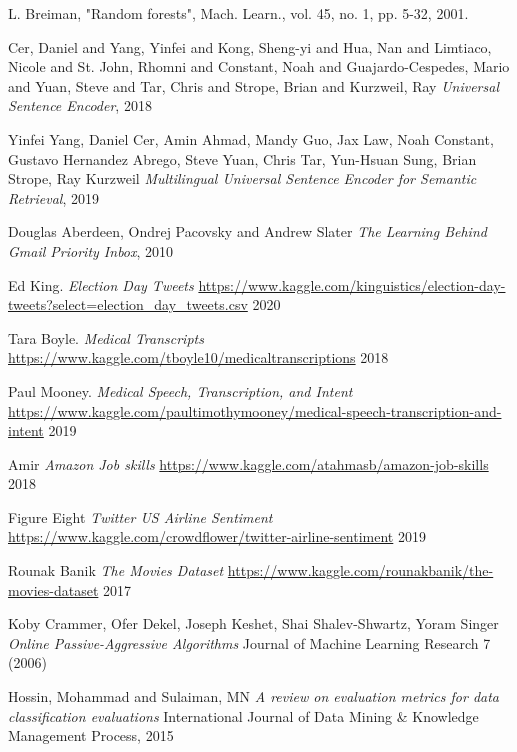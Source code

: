 \begin{thebibliography}{9}
L. Breiman, "Random forests",\newline
Mach. Learn., vol. 45, no. 1, pp. 5-32, 2001.

Cer, Daniel  and Yang, Yinfei  and Kong, Sheng-yi  and
Hua, Nan  and Limtiaco, Nicole  and St. John, Rhomni  and
Constant, Noah  and Guajardo-Cespedes, Mario  and Yuan, Steve  and
Tar, Chris  and Strope, Brian  and Kurzweil, Ray\newline
\textit{Universal Sentence Encoder}, 2018

Yinfei Yang, Daniel Cer, Amin Ahmad, Mandy Guo, Jax Law, Noah Constant, Gustavo Hernandez Abrego, Steve Yuan, Chris Tar, Yun-Hsuan Sung, Brian Strope, Ray Kurzweil
\textit{Multilingual Universal Sentence Encoder for Semantic Retrieval}, 2019

Douglas Aberdeen, Ondrej Pacovsky  and Andrew Slater\newline
\textit{The Learning Behind Gmail Priority Inbox}, 2010

Ed King.
\textit{Election Day Tweets}
\url{https://www.kaggle.com/kinguistics/election-day-tweets?select=election_day_tweets.csv}
2020

Tara Boyle.
\textit{Medical Transcripts}
\url{https://www.kaggle.com/tboyle10/medicaltranscriptions}
2018

Paul Mooney.
\textit{Medical Speech, Transcription, and Intent}
\url{https://www.kaggle.com/paultimothymooney/medical-speech-transcription-and-intent}
2019

Amir
\textit{Amazon Job skills}
\url{https://www.kaggle.com/atahmasb/amazon-job-skills}
2018

Figure Eight
\textit{Twitter US Airline Sentiment}
\url{https://www.kaggle.com/crowdflower/twitter-airline-sentiment}
2019

Rounak Banik
\textit{The Movies Dataset}
\url{https://www.kaggle.com/rounakbanik/the-movies-dataset}
2017

Koby Crammer, Ofer Dekel, Joseph Keshet, Shai Shalev-Shwartz, Yoram Singer\newline
\textit{Online Passive-Aggressive Algorithms}\newline
Journal of Machine Learning Research 7 (2006) 

Hossin, Mohammad and Sulaiman, MN\newline
\textit{A review on evaluation metrics for data classification evaluations}\newline
International Journal of Data Mining \& Knowledge Management Process, 2015


\end{thebibliography}
